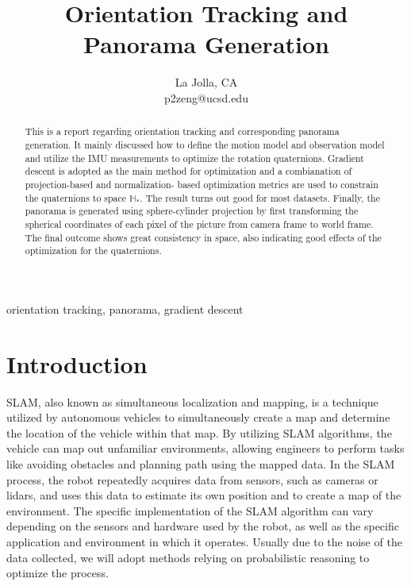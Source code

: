 \documentclass[conference]{IEEEtran}
\begin{document}
\title{Orientation Tracking and Panorama Generation\\

}

\author{
    La Jolla, CA \\
    p2zeng@ucsd.edu}


\maketitle

\begin{abstract}
    This is a report regarding orientation tracking and corresponding panorama generation. It mainly discussed how to
    define the motion model and observation model and utilize the IMU measurements to optimize the rotation quaternions.
    Gradient descent is adopted as the main method for optimization and a combianation of projection-based and normalization-
    based optimization metrics are used to constrain the quaternions to space $\mathbb{H}_*$. The result turns out good for
    most datasets. Finally, the panorama is
    generated using sphere-cylinder projection by first transforming the spherical coordinates of each pixel of the picture from
    camera frame to world frame. The final outcome shows great consistency in space, also indicating good effects of the optimization
    for the quaternions.
\end{abstract}

\begin{IEEEkeywords}
    orientation tracking, panorama, gradient descent
\end{IEEEkeywords}

\section{Introduction}

SLAM, also known as simultaneous localization and mapping, is a technique utilized by autonomous vehicles to 
simultaneously create a map and determine the location of the vehicle within that map. By utilizing SLAM algorithms,
the vehicle can map out unfamiliar environments, allowing engineers to perform tasks like avoiding obstacles and 
planning path using the mapped data. In the SLAM process, the robot repeatedly acquires data from sensors, 
such as cameras or lidars, and uses this data to estimate its own position and to create a map of the environment.
The specific implementation of the SLAM algorithm can vary depending on the sensors and hardware used by the robot,
as well as the specific application and environment in which it operates. Usually due to the noise of the data 
collected, we will adopt methods relying on probabilistic reasoning to optimize the process.
\end{document}
